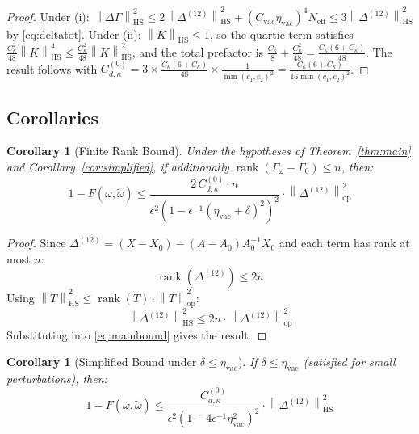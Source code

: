 \documentclass[11pt,a4paper]{article}
\theoremstyle{plain}
\newtheorem{corollary}[theorem]{Corollary}
\theoremstyle{definition}
\theoremstyle{remark}
\newcommand{\opnorm}[1]{\left\lVert #1 \right\rVert_{\mathrm{op}}}
\newcommand{\hsnorm}[1]{\left\lVert #1 \right\rVert_{\mathrm{HS}}}
\newcommand{\rank}{\operatorname{rank}}
\newcommand{\etavac}{\eta_{\mathrm{vac}}}
\newcommand{\Cvac}{C_{\mathrm{vac}}}
\newcommand{\Neff}{N_{\mathrm{eff}}}
\newcommand{\Ckappa}{C_{\kappa}}
\newcommand{\Cd}{C^{(0)}_{d,\kappa}}
\begin{document}
\begin{proof}
Under (i): $\hsnorm{\Delta\Gamma}^2 \le 2\hsnorm{\Delta^{(12)}}^2
+ (\Cvac\etavac)^4\Neff \le 3\hsnorm{\Delta^{(12)}}^2$ by \eqref{eq:deltatot}.
Under (ii): $\hsnorm{K} \le 1$, so the quartic term satisfies
$\frac{\Ckappa^2}{48}\hsnorm{K}^4 \le \frac{\Ckappa^2}{48}\hsnorm{K}^2$, and the
total prefactor is $\frac{\Ckappa}{8} + \frac{\Ckappa^2}{48}
= \frac{\Ckappa(6+\Ckappa)}{48}$. The result follows with
$\Cd = 3 \times \frac{\Ckappa(6+\Ckappa)}{48} \times \frac{1}{\min(c_1,c_2)^2}
= \frac{\Ckappa(6+\Ckappa)}{16\min(c_1,c_2)^2}$.
\end{proof}

\subsection{Corollaries}

\begin{corollary}[Finite Rank Bound]\label{cor:finiterank}
Under the hypotheses of Theorem~\ref{thm:main} and
Corollary~\ref{cor:simplified}, if additionally
$\rank(\Gamma_\omega - \Gamma_0) \le n$, then:
\begin{equation}
1 - F(\omega, \tilde{\omega}) \le
\frac{2\,\Cd \cdot n}{\epsilon^2\left(1 - \epsilon^{-1}(\etavac + \delta)^2\right)^2}
\cdot \opnorm{\Delta^{(12)}}^2
\end{equation}
\end{corollary}

\begin{proof}
Since $\Delta^{(12)} = (X - X_0) - (A - A_0)A_0^{-1}X_0$ and each term has rank at
most $n$:
\begin{equation}
\rank(\Delta^{(12)}) \le 2n
\end{equation}
Using $\hsnorm{T}^2 \le \rank(T)\cdot\opnorm{T}^2$:
\begin{equation}
\hsnorm{\Delta^{(12)}}^2 \le 2n \cdot \opnorm{\Delta^{(12)}}^2
\end{equation}
Substituting into \eqref{eq:mainbound} gives the result.
\end{proof}

\begin{corollary}[Simplified Bound under $\delta \le \etavac$]\label{cor:deltaeta}
If $\delta \le \etavac$ (satisfied for small perturbations), then:
\begin{equation}
1 - F(\omega, \tilde{\omega}) \le
\frac{\Cd}{\epsilon^2\left(1 - 4\epsilon^{-1}\etavac^2\right)^2}
\cdot \hsnorm{\Delta^{(12)}}^2
\end{equation}
\end{corollary}
\end{document}
